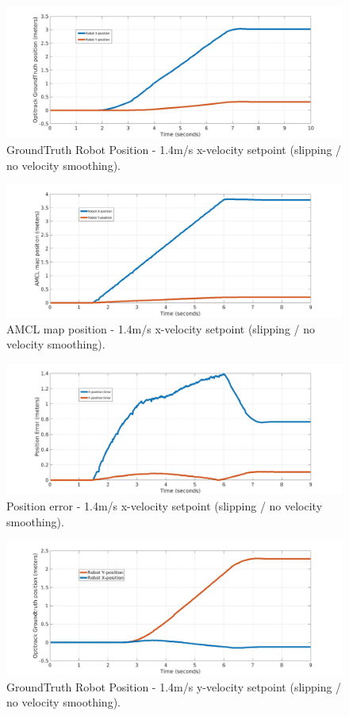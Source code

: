 \begin{figure}[H]
	\centering
	\includegraphics[width=12cm]{images/03-foundation/opti14}
	\caption{GroundTruth Robot Position - 1.4m/s x-velocity setpoint (slipping / no velocity smoothing).} 
	\label{opti14}
\end{figure}

\begin{figure}[H]
	\centering
	\includegraphics[width=12cm]{images/03-foundation/amcl14}
	\caption{AMCL map position - 1.4m/s x-velocity setpoint (slipping / no velocity smoothing).} 
	\label{amcl14}
\end{figure}

\begin{figure}[H]
	\centering
	\includegraphics[width=12cm]{images/03-foundation/poserror14}
	\caption{Position error - 1.4m/s x-velocity setpoint (slipping / no velocity smoothing).} 
	\label{poserror14}
\end{figure}

\begin{figure}[H]
	\centering
	\includegraphics[width=12cm]{images/03-foundation/opti14y}
	\caption{GroundTruth Robot Position - 1.4m/s y-velocity setpoint (slipping / no velocity smoothing).} 
	\label{opti14y}
\end{figure}

